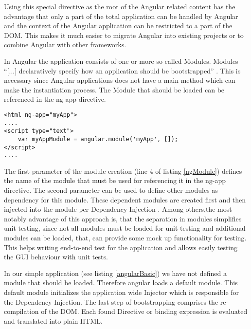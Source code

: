 Using this special directive as the root of the Angular related content has the advantage that only a part of the total application can be handled by Angular and the context of the Angular application can be restricted to a part of the DOM.
This makes it much easier to migrate Angular into existing projects or to combine Angular with other frameworks.

In Angular the application consists of one or more so called Modules.
Modules \enquote{[...] declaratively specify how an application should be bootstrapped} \autocite{tech-ana:ng-module}.
This is necessary since Angular applications does not have a main method which can make the instantiation process.
The Module that should be loaded can be referenced in the ng-app directive.\\[5mm]

\begin{lstlisting}[label=ngModule,caption=ng-app declaration with module]
<html ng-app="myApp">
....
<script type="text">
	var myAppModule = angular.module('myApp', []);
</script>
....
\end{lstlisting}

The first parameter of the module creation (line 4 of listing \ref{ngModule}) defines the name of the module that must be used for referencing it in the ng-app directive.
The second parameter can be used to define other modules as dependency for this module.
These dependent modules are created first and then injected into the module per Dependency Injection .
Among others,the most notably advantage of this approach is, that the separation in modules simplifies unit testing, since not all modules must be loaded for unit testing and additional modules can be loaded, that, can provide some mock up functionality for testing.
This helps writing end-to-end test for the application and allows easily testing the GUI behaviour with unit tests. 

In our simple application (see listing \ref{angularBasic}) we have not defined a module that should be loaded. 
Therefore angular loads a default module.
This default module initializes the application wide Injector which is responsible for the Dependency Injection.
The last step of bootstrapping comprises the re-compilation of the DOM.
Each found Directive or binding expression is evaluated and translated into plain HTML.

